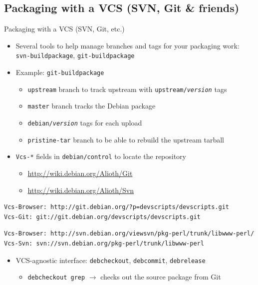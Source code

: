 \documentclass[10pt,final]{beamer}
\begin{document}
\subsection{Packaging with a VCS (SVN, Git \& friends)}
\begin{frame}[fragile]{Packaging with a VCS (SVN, Git, etc.)}
  \begin{itemize}
  \item Several tools to help manage branches and tags for your packaging work:\\
    \texttt{svn-buildpackage}, \texttt{git-buildpackage}
    \hbr
  \item Example: \texttt{git-buildpackage}
    \begin{itemize}
    \item \texttt{upstream} branch to track upstream with \texttt{upstream/\textsl{version}} tags
    \item \texttt{master} branch tracks the Debian package
    \item \texttt{debian/\textsl{version}} tags for each upload
    \item \texttt{pristine-tar} branch to be able to rebuild the upstream tarball
    \end{itemize}
    \hbr
  \item \texttt{Vcs-*} fields in \texttt{debian/control} to locate the repository
	  \begin{itemize}
		\item \url{http://wiki.debian.org/Alioth/Git}
		\item \url{http://wiki.debian.org/Alioth/Svn}
	\end{itemize}
\end{itemize}
  \begin{lstlisting}[basicstyle=\ttfamily\footnotesize]
Vcs-Browser: http://git.debian.org/?p=devscripts/devscripts.git
Vcs-Git: git://git.debian.org/devscripts/devscripts.git
  \end{lstlisting}
  \begin{lstlisting}[basicstyle=\ttfamily\footnotesize]
Vcs-Browser: http://svn.debian.org/viewsvn/pkg-perl/trunk/libwww-perl/
Vcs-Svn: svn://svn.debian.org/pkg-perl/trunk/libwww-perl
  \end{lstlisting}
  \begin{itemize}
  \item VCS-agnostic interface: \texttt{debcheckout}, \texttt{debcommit},
    \texttt{debrelease}\\
    \begin{itemize}
	    \item     \texttt{debcheckout grep} $\rightarrow$ checks out the source package
    from Git
    \end{itemize}
\end{itemize}
\end{frame}
\end{document}
